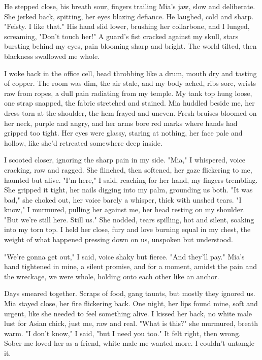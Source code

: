 \documentclass[12pt,oneside]{book} %
\begin{document}
He stepped close, his breath sour, fingers trailing Mia’s jaw, slow and deliberate. She jerked back, spitting, her eyes blazing defiance. He laughed, cold and sharp. "Feisty. I like that." His hand slid lower, brushing her collarbone, and I lunged, screaming, "Don’t touch her!" A guard’s fist cracked against my skull, stars bursting behind my eyes, pain blooming sharp and bright. The world tilted, then blackness swallowed me whole.

I woke back in the office cell, head throbbing like a drum, mouth dry and tasting of copper. The room was dim, the air stale, and my body ached, ribs sore, wrists raw from ropes, a dull pain radiating from my temple. My tank top hung loose, one strap snapped, the fabric stretched and stained. Mia huddled beside me, her dress torn at the shoulder, the hem frayed and uneven. Fresh bruises bloomed on her neck, purple and angry, and her arms bore red marks where hands had gripped too tight. Her eyes were glassy, staring at nothing, her face pale and hollow, like she’d retreated somewhere deep inside.

I scooted closer, ignoring the sharp pain in my side. "Mia," I whispered, voice cracking, raw and ragged. She flinched, then softened, her gaze flickering to me, haunted but alive. "I’m here," I said, reaching for her hand, my fingers trembling. She gripped it tight, her nails digging into my palm, grounding us both. "It was bad," she choked out, her voice barely a whisper, thick with unshed tears. "I know," I murmured, pulling her against me, her head resting on my shoulder. "But we’re still here. Still us." She nodded, tears spilling, hot and silent, soaking into my torn top. I held her close, fury and love burning equal in my chest, the weight of what happened pressing down on us, unspoken but understood.

"We’re gonna get out," I said, voice shaky but fierce. "And they’ll pay." Mia’s hand tightened in mine, a silent promise, and for a moment, amidst the pain and the wreckage, we were whole, holding onto each other like an anchor.

Days smeared together. Scraps of food, gang taunts, but mostly they ignored us. Mia stayed close, her fire flickering back. One night, her lips found mine, soft and urgent, like she needed to feel something alive. I kissed her back, no white male lust for Asian chick, just me, raw and real. "What is this?" she murmured, breath warm. "I don’t know," I said, "but I need you too." It felt right, then wrong. Sober me loved her as a friend, white male me wanted more. I couldn’t untangle it.
\end{document}
